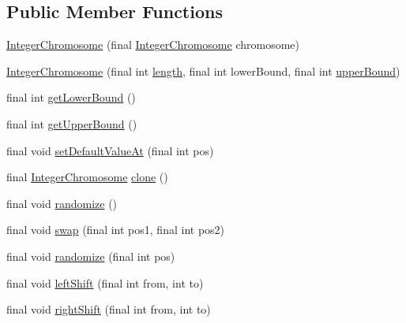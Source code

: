 \subsection*{Public Member Functions}
\begin{DoxyCompactItemize}
\item 
\hyperlink{classjenes_1_1chromosome_1_1_integer_chromosome_a10f477c2c6fb3893a0fc331a933e5b39}{Integer\-Chromosome} (final \hyperlink{classjenes_1_1chromosome_1_1_integer_chromosome}{Integer\-Chromosome} chromosome)
\item 
\hyperlink{classjenes_1_1chromosome_1_1_integer_chromosome_a44849b4866ead257aacae333ad7737bd}{Integer\-Chromosome} (final int \hyperlink{classjenes_1_1chromosome_1_1_integer_chromosome_a8e44ab8d05b2632e72c209c641f10073}{length}, final int lower\-Bound, final int \hyperlink{classjenes_1_1chromosome_1_1_integer_chromosome_a8f49670d7d429ea62a3cf77949babe15}{upper\-Bound})
\item 
final int \hyperlink{classjenes_1_1chromosome_1_1_integer_chromosome_ae3932d5f359d42a6fb783f9254e870b7}{get\-Lower\-Bound} ()
\item 
final int \hyperlink{classjenes_1_1chromosome_1_1_integer_chromosome_af5a9d680853b67fd2ad8fc96853957d5}{get\-Upper\-Bound} ()
\item 
final void \hyperlink{classjenes_1_1chromosome_1_1_integer_chromosome_afa0e3d50dbda7f0c84f8558776543d7c}{set\-Default\-Value\-At} (final int pos)
\item 
final \hyperlink{classjenes_1_1chromosome_1_1_integer_chromosome}{Integer\-Chromosome} \hyperlink{classjenes_1_1chromosome_1_1_integer_chromosome_a9189b20273989ee1e83aa21ca11a982d}{clone} ()
\item 
final void \hyperlink{classjenes_1_1chromosome_1_1_integer_chromosome_a8474f73dce296ea5625dc9edb235cd47}{randomize} ()
\item 
final void \hyperlink{classjenes_1_1chromosome_1_1_integer_chromosome_a2a591c336fedcfd457d4d874a2db328e}{swap} (final int pos1, final int pos2)
\item 
final void \hyperlink{classjenes_1_1chromosome_1_1_integer_chromosome_a5f05ea95b9e86f784f6f1bdff3cbfe54}{randomize} (final int pos)
\item 
final void \hyperlink{classjenes_1_1chromosome_1_1_integer_chromosome_a8a05522811de03e5ea9fff08385ac306}{left\-Shift} (final int from, int to)
\item 
final void \hyperlink{classjenes_1_1chromosome_1_1_integer_chromosome_a361afe717a58a8b47316e62178b387f5}{right\-Shift} (final int from, int to)

\end{DoxyCompactItemize}
